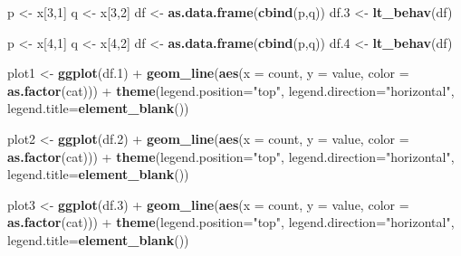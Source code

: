 \documentclass[]{article}
\newenvironment{Shaded}{\begin{snugshade}}{\end{snugshade}}
\newcommand{\KeywordTok}[1]{\textcolor[rgb]{0.13,0.29,0.53}{\textbf{{#1}}}}
\newcommand{\DataTypeTok}[1]{\textcolor[rgb]{0.13,0.29,0.53}{{#1}}}
\newcommand{\DecValTok}[1]{\textcolor[rgb]{0.00,0.00,0.81}{{#1}}}
\newcommand{\FloatTok}[1]{\textcolor[rgb]{0.00,0.00,0.81}{{#1}}}
\newcommand{\StringTok}[1]{\textcolor[rgb]{0.31,0.60,0.02}{{#1}}}
\newcommand{\NormalTok}[1]{{#1}}
\begin{document}
\begin{Shaded}
\begin{Highlighting}[]
\NormalTok{p <-}\StringTok{ }\NormalTok{x[}\DecValTok{3}\NormalTok{,}\DecValTok{1}\NormalTok{]}
\NormalTok{q <-}\StringTok{ }\NormalTok{x[}\DecValTok{3}\NormalTok{,}\DecValTok{2}\NormalTok{]}
\NormalTok{df <-}\StringTok{ }\KeywordTok{as.data.frame}\NormalTok{(}\KeywordTok{cbind}\NormalTok{(p,q))}
\NormalTok{df}\FloatTok{.3} \NormalTok{<-}\StringTok{ }\KeywordTok{lt_behav}\NormalTok{(df)}

\NormalTok{p <-}\StringTok{ }\NormalTok{x[}\DecValTok{4}\NormalTok{,}\DecValTok{1}\NormalTok{]}
\NormalTok{q <-}\StringTok{ }\NormalTok{x[}\DecValTok{4}\NormalTok{,}\DecValTok{2}\NormalTok{]}
\NormalTok{df <-}\StringTok{ }\KeywordTok{as.data.frame}\NormalTok{(}\KeywordTok{cbind}\NormalTok{(p,q))}
\NormalTok{df}\FloatTok{.4} \NormalTok{<-}\StringTok{ }\KeywordTok{lt_behav}\NormalTok{(df)}


\NormalTok{plot1 <-}\StringTok{ }\KeywordTok{ggplot}\NormalTok{(df}\FloatTok{.1}\NormalTok{) +}\StringTok{ }
\StringTok{         }\KeywordTok{geom_line}\NormalTok{(}\KeywordTok{aes}\NormalTok{(}\DataTypeTok{x =} \NormalTok{count, }\DataTypeTok{y =} \NormalTok{value, }\DataTypeTok{color =} \KeywordTok{as.factor}\NormalTok{(cat))) +}\StringTok{ }
\StringTok{         }\KeywordTok{theme}\NormalTok{(}\DataTypeTok{legend.position=}\StringTok{"top"}\NormalTok{, }\DataTypeTok{legend.direction=}\StringTok{"horizontal"}\NormalTok{, }\DataTypeTok{legend.title=}\KeywordTok{element_blank}\NormalTok{()) }

\NormalTok{plot2 <-}\StringTok{ }\KeywordTok{ggplot}\NormalTok{(df}\FloatTok{.2}\NormalTok{) +}\StringTok{ }
\StringTok{         }\KeywordTok{geom_line}\NormalTok{(}\KeywordTok{aes}\NormalTok{(}\DataTypeTok{x =} \NormalTok{count, }\DataTypeTok{y =} \NormalTok{value, }\DataTypeTok{color =} \KeywordTok{as.factor}\NormalTok{(cat))) +}\StringTok{ }
\StringTok{         }\KeywordTok{theme}\NormalTok{(}\DataTypeTok{legend.position=}\StringTok{"top"}\NormalTok{, }\DataTypeTok{legend.direction=}\StringTok{"horizontal"}\NormalTok{, }\DataTypeTok{legend.title=}\KeywordTok{element_blank}\NormalTok{()) }

\NormalTok{plot3 <-}\StringTok{ }\KeywordTok{ggplot}\NormalTok{(df}\FloatTok{.3}\NormalTok{) +}\StringTok{ }
\StringTok{         }\KeywordTok{geom_line}\NormalTok{(}\KeywordTok{aes}\NormalTok{(}\DataTypeTok{x =} \NormalTok{count, }\DataTypeTok{y =} \NormalTok{value, }\DataTypeTok{color =} \KeywordTok{as.factor}\NormalTok{(cat))) +}\StringTok{ }
\StringTok{         }\KeywordTok{theme}\NormalTok{(}\DataTypeTok{legend.position=}\StringTok{"top"}\NormalTok{, }\DataTypeTok{legend.direction=}\StringTok{"horizontal"}\NormalTok{, }\DataTypeTok{legend.title=}\KeywordTok{element_blank}\NormalTok{()) }


\end{Highlighting}
\end{Shaded}
\end{document}
